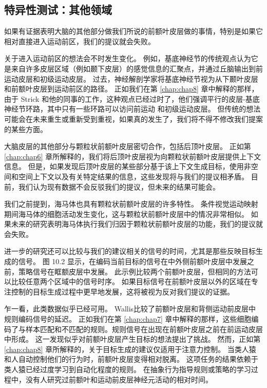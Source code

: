 \subsection{特异性测试：其他领域}

如果有证据表明大脑的其他部分做我们所说的前额叶皮层做的事情，特别是如果它相对直接进入运动前区，我们的提议就会失败。
\par


关于进入运动前区的想法会不时发生变化。
例如，基底神经节的传统观点认为它是来自许多皮层区域（例如颞下皮层）的感觉信息的汇聚点，并通过丘脑输出到前运动皮层和初级运动皮层。
过去，神经解剖学家将基底神经节视为从下颞叶皮层和前额叶皮层到运动前区的路径\cite{kemp1971connexions}。
正如我们在第 \ref{chap:chap8} 章中解释的那样，由于 Strick 和他的同事\cite{middleton2000basal}的工作，这种观点已经过时了，他们强调平行的皮层-基底神经节环路，其中只有一些环路可以访问前运动 和初级运动皮层。
但传统的想法可能会在未来重生或重新受到重视，如果真的发生了，我们将不得不修改我们提案的某些方面。
\par


大脑皮层的其他部分与颗粒状前额叶皮层密切合作，包括后顶叶皮层。
正如第 \ref{chap:chap6} 章所解释的，我们将后顶叶皮层视为向颗粒状前额叶皮层提供上下文信息。
但是，如果发现后顶叶皮层的某些部分基于该上下文生成目标，使用非空间和空间上下文以及有关特定结果的信息，这些发现将与我们的提议相矛盾。
目前，我们认为现有数据不会反驳我们的提议，但未来的结果可能会。
\par


我们之前提到，海马体也具有颗粒状前额叶皮层的许多特性。
条件视觉运动映射期间海马体的细胞活动发生变化\cite{cahusac1993modification,yanike2009comparison}，这与颗粒状前额叶皮层中的情况非常相似\cite{pasupathy2005different}。
如果未来的研究表明海马体执行我们归因于颗粒状前额叶皮层的功能，我们的提议就会失败。
\par


进一步的研究还可以比较与我们的建议相关的信号的时间，尤其是那些反映目标生成的信号。
图 10.2 显示，在编码当前目标的信号在中外侧前额叶皮层中发展之前，策略信号在眶额皮层中发展\cite{tsujimoto2011comparison}。
此示例比较两个前额叶皮层，但相同的方法可以比较任意两个区域中的信号时序。
如果目标信号在前额叶皮层以外的区域在专注控制的目标生成过程中更早地发展，这将被视为反对我们提议的证据。
\par


乍一看，此类数据似乎已经可用。
Wallis\cite{wallis2003rule}比较了前额叶皮层和背侧运动前皮层中规则编码信号的延迟。
正如我们在第 \ref{chap:chap7} 章中解释的那样，这些细胞编码了与样本匹配和不匹配的规则。规则信号在出现在前额叶皮层之前在前运动皮层中形成。
这一发现似乎对前额叶皮层产生目标的想法提出了挑战。
然而，正如第 \ref{chap:chap8} 章所解释的，关于目标生成的建议仅适用于注意力控制。
当类人猿和人自动控制他们的行为时，前额叶皮层变得相对脱离。
这项任务的结果依赖于类人猿已经过度学习到自动化程度的规则\cite{wallis2003rule,muhammad2006comparison}。
在抽象行为指导规则或策略的学习过程中，没有人研究过前额叶和运动前皮层神经元活动的相对时间。



